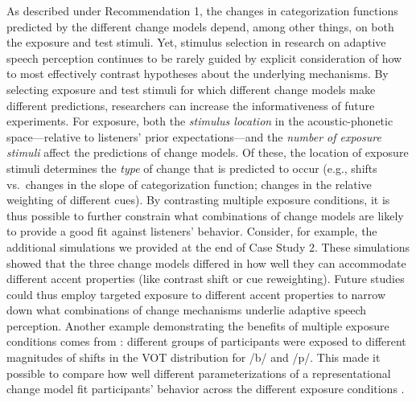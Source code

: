\documentclass[
  11pt,
  man,floatsintext]{apa6}
\begin{document}
As described under Recommendation 1, the changes in categorization functions predicted by the different change models depend, among other things, on both the exposure and test stimuli. Yet, stimulus selection in research on adaptive speech perception continues to be rarely guided by explicit consideration of how to most effectively contrast hypotheses about the underlying mechanisms. By selecting exposure and test stimuli for which different change models make different predictions, researchers can increase the informativeness of future experiments. For exposure, both the \emph{stimulus location} in the acoustic-phonetic space---relative to listeners' prior expectations---and the \emph{number of exposure stimuli} affect the predictions of change models. Of these, the location of exposure stimuli determines the \emph{type} of change that is predicted to occur (e.g., shifts vs.~changes in the slope of categorization function; changes in the relative weighting of different cues). By contrasting multiple exposure conditions, it is thus possible to further constrain what combinations of change models are likely to provide a good fit against listeners' behavior. Consider, for example, the additional simulations we provided at the end of Case Study 2. These simulations showed that the three change models differed in how well they can accommodate different accent properties (like contrast shift or cue reweighting). Future studies could thus employ targeted exposure to different accent properties to narrow down what combinations of change mechanisms underlie adaptive speech perception. Another example demonstrating the benefits of multiple exposure conditions comes from \textcite{kleinschmidt-jaeger2016cogsci}: different groups of participants were exposed to different magnitudes of shifts in the VOT distribution for /b/ and /p/. This made it possible to compare how well different parameterizations of a representational change model fit participants' behavior across the different exposure conditions \autocite[for additional analyses and discussion, see also][]{kleinschmidt2020}.
\end{document}
